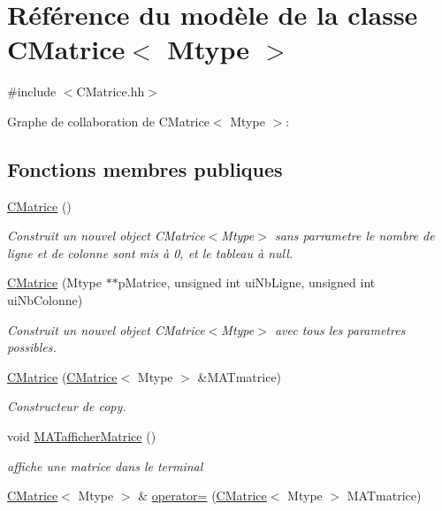 \hypertarget{classCMatrice}{}\section{Référence du modèle de la classe C\+Matrice$<$ Mtype $>$}
\label{classCMatrice}


{\ttfamily \#include $<$C\+Matrice.\+hh$>$}



Graphe de collaboration de C\+Matrice$<$ Mtype $>$\+:
\subsection*{Fonctions membres publiques}
\begin{DoxyCompactItemize}
\item 
\hyperlink{classCMatrice_a5d0995a09020ec499057c486f505fb2b}{C\+Matrice} ()
\begin{DoxyCompactList}\small\item\em Construit un nouvel object C\+Matrice$<$\+Mtype$>$ sans parrametre le nombre de ligne et de colonne sont mis à 0, et le tableau à null. \end{DoxyCompactList}\item 
\hyperlink{classCMatrice_ae9e91dd3270e72d4d5787f4ae789a740}{C\+Matrice} (Mtype $\ast$$\ast$p\+Matrice, unsigned int ui\+Nb\+Ligne, unsigned int ui\+Nb\+Colonne)
\begin{DoxyCompactList}\small\item\em Construit un nouvel object C\+Matrice$<$\+Mtype$>$ avec tous les parametres possibles. \end{DoxyCompactList}\item 
\hyperlink{classCMatrice_a2585d9a704eb518ba0b500bc0b5b978a}{C\+Matrice} (\hyperlink{classCMatrice}{C\+Matrice}$<$ Mtype $>$ \&M\+A\+Tmatrice)
\begin{DoxyCompactList}\small\item\em Constructeur de copy. \end{DoxyCompactList}\item 
void \hyperlink{classCMatrice_a448fbaa3f221b599abeb8abf3f289881}{M\+A\+Tafficher\+Matrice} ()
\begin{DoxyCompactList}\small\item\em affiche une matrice dans le terminal \end{DoxyCompactList}\item 
\hyperlink{classCMatrice}{C\+Matrice}$<$ Mtype $>$ \& \hyperlink{classCMatrice_afe427d425d3204c25faf865d5ba1ef09}{operator=} (\hyperlink{classCMatrice}{C\+Matrice}$<$ Mtype $>$ M\+A\+Tmatrice)
$$
\end{DoxyCompactItemize}
